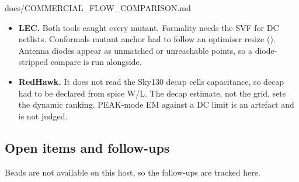 \begin{relocated}{docs/COMMERCIAL_FLOW_COMPARISON.md}
\begin{itemize}
  \texttt{COUPLING\_\allowbreak{}ABS\_\allowbreak{}THRESHOLD\ 0.\allowbreak{}1}
  / \texttt{REL\ 0} and
  \texttt{LEF\_\allowbreak{}USE\_\allowbreak{}OBS\ NO} to match
  OpenRCX\textquotesingle s coupling share. The remaining per-pin C term
  is the main calibration residual.
\item
  \textbf{LEC.} Both tools caught every mutant. Formality needs the SVF
  for DC netlists. Conformal\textquotesingle s  mutant anchor
  had to follow an optimiser resize (). Antenna diodes
  appear as unmatched or unreachable points, so a diode-stripped compare
  is run alongside.
\item
  \textbf{RedHawk.} It does not read the Sky130 decap
  cells\textquotesingle{} capacitance, so decap had to be declared from
  spice W/L. The decap estimate, not the grid, sets the dynamic ranking.
  PEAK-mode EM against a DC limit is an artefact and is not judged.
\end{itemize}

\subsection{Open items and follow-ups}\label{tm:pd:commercial-flow-comparison:7-open-items-and-follow-ups}

Beads are not available on this host, so the follow-ups are tracked
here.


\end{relocated}
